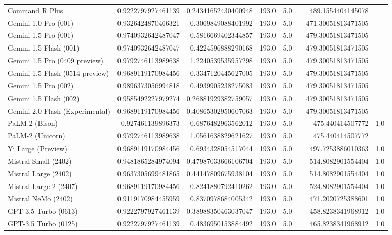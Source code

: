 \begin{table}[htp]
{\begin{tabular}{lrrrrrrr}
Command R Plus & 0.9222797927461139 & 0.24341652430400948 & 193.0 & 5.0 &  & 489.1554404145078 &  \\
Gemini 1.0 Pro (001) & 0.9326424870466321 & 0.3069849088401992 & 193.0 & 5.0 &  & 471.30051813471505 &  \\
Gemini 1.5 Pro (001) & 0.9740932642487047 & 0.5816669402344857 & 193.0 & 5.0 &  & 479.30051813471505 &  \\
Gemini 1.5 Flash (001) & 0.9740932642487047 & 0.4224596888290168 & 193.0 & 5.0 &  & 479.30051813471505 &  \\
Gemini 1.5 Pro (0409 preview) & 0.9792746113989638 & 1.2240539535957298 & 193.0 & 5.0 &  & 479.30051813471505 &  \\
Gemini 1.5 Flash (0514 preview) & 0.9689119170984456 & 0.3347120445627005 & 193.0 & 5.0 &  & 479.30051813471505 &  \\
Gemini 1.5 Pro (002) & 0.9896373056994818 & 0.4939905238275083 & 193.0 & 5.0 &  & 479.30051813471505 &  \\
Gemini 1.5 Flash (002) & 0.9585492227979274 & 0.26881929382759057 & 193.0 & 5.0 &  & 479.30051813471505 &  \\
Gemini 2.0 Flash (Experimental) & 0.9689119170984456 & 0.40865302950607063 & 193.0 & 5.0 &  & 479.30051813471505 &  \\
PaLM-2 (Bison) & 0.927461139896373 & 0.6876482963562012 & 193.0 & 5.0 &  & 475.440414507772 & 1.0 \\
PaLM-2 (Unicorn) & 0.9792746113989638 & 1.0561638829621627 & 193.0 & 5.0 &  & 475.440414507772 &  \\
Yi Large (Preview) & 0.9689119170984456 & 0.6934328054517044 & 193.0 & 5.0 &  & 497.7253886010363 & 1.0 \\
Mistral Small (2402) & 0.9481865284974094 & 0.47987033666106704 & 193.0 & 5.0 &  & 514.8082901554404 & 1.0 \\
Mistral Large (2402) & 0.9637305699481865 & 0.44147809675938104 & 193.0 & 5.0 &  & 514.8082901554404 & 1.0 \\
Mistral Large 2 (2407) & 0.9689119170984456 & 0.8241880792410262 & 193.0 & 5.0 &  & 524.8082901554404 & 1.0 \\
Mistral NeMo (2402) & 0.9119170984455959 & 0.8370978684005342 & 193.0 & 5.0 &  & 471.2020725388601 & 1.0 \\
GPT-3.5 Turbo (0613) & 0.9222797927461139 & 0.38988350463037047 & 193.0 & 5.0 &  & 458.8238341968912 & 1.0 \\
GPT-3.5 Turbo (0125) & 0.9222797927461139 & 0.4836950153884492 & 193.0 & 5.0 &  & 465.8238341968912 & 1.0 \\

\end{tabular}}
\end{table}
